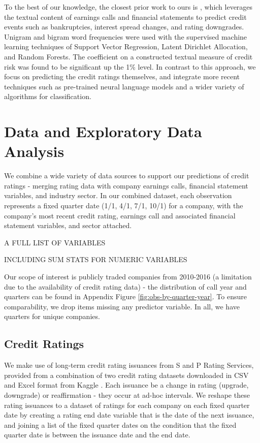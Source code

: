 \documentclass{article}[11pt]
\begin{document}
    To the best of our knowledge, the closest prior work to ours is \cite{donovan_measuring_2021}, which leverages the textual content of earnings calls and financial statements to predict credit events such as bankruptcies, interest spread changes, and rating downgrades. Unigram and bigram word frequencies were used with the supervised machine learning techniques of Support Vector Regression, Latent Dirichlet Allocation, and Random Forests. The coefficient on a constructed textual measure of credit risk was found to be significant up the 1\% level. In contrast to this approach, we focus on predicting the credit ratings themselves, and integrate more recent techniques such as pre-trained neural language models and a wider variety of algorithms for classification.

    \section*{Data and Exploratory Data Analysis}

    We combine a wide variety of data sources to support our predictions of credit ratings - merging rating data with company earnings calls, financial statement variables, and industry sector. In our combined dataset, each observation represents a fixed quarter date (1/1, 4/1, 7/1, 10/1) for a company, with the company's most recent credit rating, earnings call and associated financial statement variables, and sector attached.

    A FULL LIST OF VARIABLES

    INCLUDING SUM STATS FOR NUMERIC VARIABLES

    Our scope of interest is publicly traded companies from 2010-2016 (a limitation due to the availability of credit rating data) - the distribution of call year and quarters can be found in Appendix Figure \ref{fig:obs-by-quarter-year}. To ensure comparability, we drop items missing any predictor variable. In all, we have \numQuarters \space quarters for \numCompanies \space unique companies.

    \subsection*{Credit Ratings}

    We make use of long-term credit rating issuances from S and P Rating Services, provided from a combination of two credit rating datasets downloaded in CSV and Excel format from Kaggle \citep{gewerc_corporate_2020,makwana_corporate_2022}. Each issuance be a change in rating (upgrade, downgrade) or reaffirmation - they occur at ad-hoc intervals. We reshape these rating issuances to a dataset of ratings for each company on each fixed quarter date by creating a rating end date variable that is the date of the next issuance, and joining a list of the fixed quarter dates on the condition that the fixed quarter date is between the issuance date and the end date.
\end{document}
